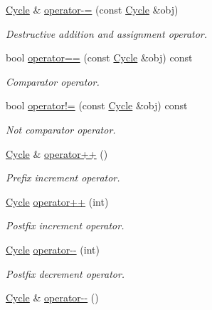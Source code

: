 \begin{DoxyCompactItemize}
\hyperlink{classcryomesh_1_1common_1_1Cycle}{\-Cycle} \& \hyperlink{classcryomesh_1_1common_1_1Cycle_a1486f852d2104c5fbf806c9f1ad783b1}{operator-\/=} (const \hyperlink{classcryomesh_1_1common_1_1Cycle}{\-Cycle} \&obj)
\begin{DoxyCompactList}\small\item\em \-Destructive addition and assignment operator. \end{DoxyCompactList}\item 
bool \hyperlink{classcryomesh_1_1common_1_1Cycle_adeb27509ede9eebe8d39605b976f3ecd}{operator==} (const \hyperlink{classcryomesh_1_1common_1_1Cycle}{\-Cycle} \&obj) const 
\begin{DoxyCompactList}\small\item\em \-Comparator operator. \end{DoxyCompactList}\item 
bool \hyperlink{classcryomesh_1_1common_1_1Cycle_a7a60d932e1b4b215ec6c5cfd829dba66}{operator!=} (const \hyperlink{classcryomesh_1_1common_1_1Cycle}{\-Cycle} \&obj) const 
\begin{DoxyCompactList}\small\item\em \-Not comparator operator. \end{DoxyCompactList}\item 
\hyperlink{classcryomesh_1_1common_1_1Cycle}{\-Cycle} \& \hyperlink{classcryomesh_1_1common_1_1Cycle_ae8ed3bd0a7d6dca37e6aff08cb18f1bb}{operator++} ()
\begin{DoxyCompactList}\small\item\em \-Prefix increment operator. \end{DoxyCompactList}\item 
\hyperlink{classcryomesh_1_1common_1_1Cycle}{\-Cycle} \hyperlink{classcryomesh_1_1common_1_1Cycle_adf4af828db11969f216159f7b6256a78}{operator++} (int)
\begin{DoxyCompactList}\small\item\em \-Postfix increment operator. \end{DoxyCompactList}\item 
\hyperlink{classcryomesh_1_1common_1_1Cycle}{\-Cycle} \hyperlink{classcryomesh_1_1common_1_1Cycle_a57b60f46c0304d9980577e1dc096aea1}{operator-\/-\/} (int)
\begin{DoxyCompactList}\small\item\em \-Postfix decrement operator. \end{DoxyCompactList}\item 
\hyperlink{classcryomesh_1_1common_1_1Cycle}{\-Cycle} \& \hyperlink{classcryomesh_1_1common_1_1Cycle_a420ad7ce993fa00a92fc61f84f3142cf}{operator-\/-\/} ()

\end{DoxyCompactItemize}
